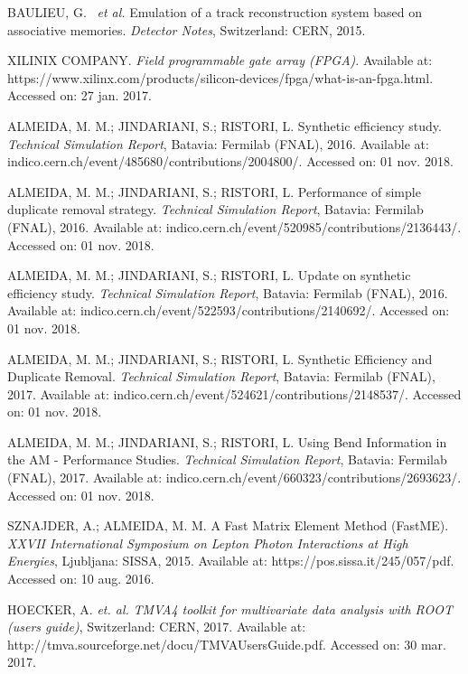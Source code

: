 \begin{thebibliography}{}
BAULIEU, G. ~\textit{et al.} Emulation of a track reconstruction system based on associative memories. \textit{Detector Notes}, Switzerland: CERN, 2015.

XILINIX COMPANY. \textit{Field programmable gate array (FPGA)}. Available at: https://www.xilinx.com/products/silicon-devices/fpga/what-is-an-fpga.html. Accessed on: 27 jan. 2017.

ALMEIDA, M. M.; JINDARIANI, S.; RISTORI, L. Synthetic efficiency study. \textit{Technical Simulation Report}, Batavia: Fermilab (FNAL), 2016. Available at: indico.cern.ch/event/485680/contributions/2004800/. Accessed on: 01 nov. 2018.

ALMEIDA, M. M.; JINDARIANI, S.; RISTORI, L. Performance of simple duplicate removal strategy. \textit{Technical Simulation Report}, Batavia: Fermilab (FNAL), 2016. Available at: indico.cern.ch/event/520985/contributions/2136443/. Accessed on: 01 nov. 2018.
	
ALMEIDA, M. M.; JINDARIANI, S.; RISTORI, L. Update on synthetic efficiency study. \textit{Technical Simulation Report}, Batavia: Fermilab (FNAL), 2016. Available at: indico.cern.ch/event/522593/contributions/2140692/. Accessed on: 01 nov. 2018.

ALMEIDA, M. M.; JINDARIANI, S.; RISTORI, L. Synthetic Efficiency and Duplicate Removal. \textit{Technical Simulation Report}, Batavia: Fermilab (FNAL), 2017. Available at: indico.cern.ch/event/524621/contributions/2148537/. Accessed on: 01 nov. 2018.
	
ALMEIDA, M. M.; JINDARIANI, S.; RISTORI, L. Using Bend Information in the AM - Performance Studies. \textit{Technical Simulation Report}, Batavia: Fermilab (FNAL), 2017. Available at: indico.cern.ch/event/660323/contributions/2693623/. Accessed on: 01 nov. 2018.
	
SZNAJDER, A.; ALMEIDA, M. M. A Fast Matrix Element Method (FastME). \textit{XXVII International Symposium on Lepton Photon Interactions at High Energies}, Ljubljana: SISSA, 2015. Available at: https://pos.sissa.it/245/057/pdf. Accessed on: 10 aug. 2016.

HOECKER, A.  \textit{et. al.} \textit{TMVA4 toolkit for multivariate data analysis with ROOT (users guide)}, Switzerland: CERN, 2017. Available at: http://tmva.sourceforge.net/docu/TMVAUsersGuide.pdf. Accessed on: 30 mar. 2017.



\end{thebibliography}
